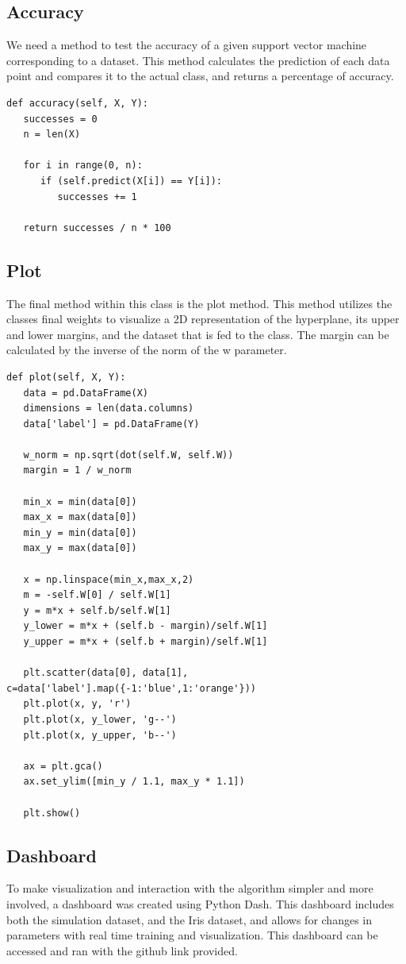 \documentclass[12pt]{article}%
\begin{document}
	\subsection{Accuracy}
	We need a method to test the accuracy of a given support vector machine corresponding to a dataset.  This method calculates the prediction of each data point and compares it to the actual class, and returns a percentage of accuracy.
\begin{verbatim}
def accuracy(self, X, Y):
   successes = 0
   n = len(X)

   for i in range(0, n):
      if (self.predict(X[i]) == Y[i]):
         successes += 1

   return successes / n * 100
\end{verbatim}
	\subsection{Plot}
	The final method within this class is the plot method.  This method utilizes the classes final weights to visualize a 2D representation of the hyperplane, its upper and lower margins, and the dataset that is fed to the class.  The margin can be calculated by the inverse of the norm of the w parameter.
\begin{verbatim}
def plot(self, X, Y):
   data = pd.DataFrame(X)
   dimensions = len(data.columns)
   data['label'] = pd.DataFrame(Y)

   w_norm = np.sqrt(dot(self.W, self.W))
   margin = 1 / w_norm

   min_x = min(data[0])
   max_x = max(data[0])
   min_y = min(data[0])
   max_y = max(data[0])

   x = np.linspace(min_x,max_x,2)
   m = -self.W[0] / self.W[1]
   y = m*x + self.b/self.W[1]
   y_lower = m*x + (self.b - margin)/self.W[1]
   y_upper = m*x + (self.b + margin)/self.W[1]

   plt.scatter(data[0], data[1], c=data['label'].map({-1:'blue',1:'orange'}))
   plt.plot(x, y, 'r')
   plt.plot(x, y_lower, 'g--')
   plt.plot(x, y_upper, 'b--')

   ax = plt.gca()
   ax.set_ylim([min_y / 1.1, max_y * 1.1])

   plt.show()
\end{verbatim}
	\subsection{Dashboard}
	To make visualization and interaction with the algorithm simpler and more involved, a dashboard was created using Python Dash.  This dashboard includes both the simulation dataset, and the Iris dataset, and allows for changes in parameters with real time training and visualization.  This dashboard can be accessed and ran with the github link provided.
\end{document}
